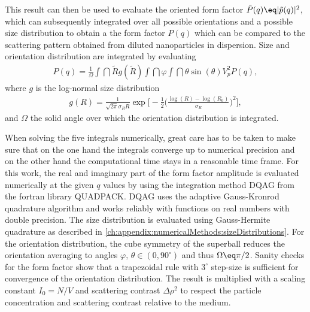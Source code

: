 \documentclass[\main/dresen_thesis.tex]{subfiles}
\begin{document}
This result can then be used to evaluate the oriented form factor $\tilde{P}(q) \eq |\tilde{p}(q)|^2$, which can subsequently integrated over all possible orientations and a possible size distribution to obtain a the form factor $P(q)$ which can be compared to the scattering pattern obtained from diluted nanoparticles in dispersion.
Size and orientation distribution are integrated by evaluating
\begin{align}
P(q) = \frac{1}{\Omega}
\int \dint \tilde{R} g(\tilde{R})  \int \dint \varphi \int \dint \theta \sin (\theta) V_p^2 P(q),
\label{eq:superball_intensity_equation}
\end{align}
where $g$ is the log-normal size distribution
\begin{align}
g(R) = \frac{1}{\sqrt{2 \pi} \sigma_R R} \exp \Bigg[ - \frac{1}{2} \bigg(\frac{\log(R) - \log(R_0)}{\sigma_R} \bigg)^2 \Bigg],
\end{align}
and $\Omega$ the solid angle over which the orientation distribution is integrated.

When solving the five integrals numerically, great care has to be taken to make sure that on the one hand the integrals converge up to numerical precision and on the other hand the computational time stays in a reasonable time frame. 
For this work, the real and imaginary part of the form factor amplitude is evaluated numerically at the given $q$ values by using the integration method DQAG from the fortran library QUADPACK.
DQAG uses the adaptive Gauss-Kronrod quadrature algorithm and works reliably with functions on real numbers with double precision.
The size distribution is evaluated using Gauss-Hermite quadrature as described in \ref{ch:appendix:numericalMethods:sizeDistributions}.
For the orientation distribution, the cube symmetry of the superball reduces the orientation averaging to angles $\varphi,\, \theta \in (0, 90 ^\circ)$ and thus $\Omega \eq \pi / 2$.
Sanity checks for the form factor show that a trapezoidal rule with $3^{\circ}$ step-size is sufficient for convergence of the orientation distribution.
The result is multiplied with a scaling constant $I_0=N/V$ and scattering contrast $\Delta \rho^2$ to respect the particle concentration and scattering contrast relative to the medium.
\end{document}
